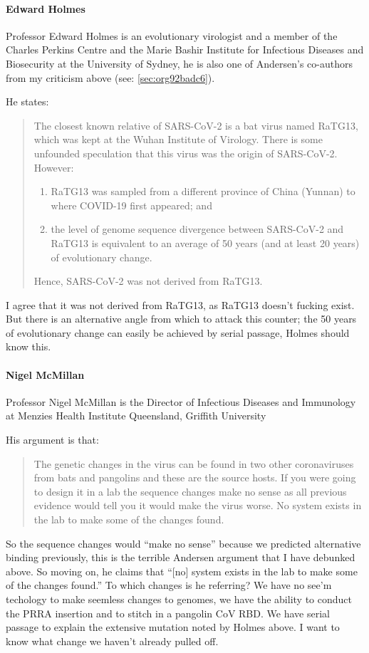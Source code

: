 \documentclass[11pt]{article}
\begin{document}
\paragraph{Edward Holmes}
\label{sec:orga7ef0a5}
Professor Edward Holmes is an evolutionary virologist and a member of the Charles Perkins Centre and the Marie Bashir Institute for Infectious Diseases and Biosecurity at the University of Sydney, he is also one of Andersen's co-authors from my criticism above (see: \ref{sec:org92badc6}).

He states:
\begin{quote}
The closest known relative of SARS-CoV-2 is a bat virus named RaTG13, which was kept at the Wuhan Institute of Virology. There is some unfounded speculation that this virus was the origin of SARS-CoV-2. However:

\begin{enumerate}
\item RaTG13 was sampled from a different province of China (Yunnan) to where COVID-19 first appeared; and
\item the level of genome sequence divergence between SARS-CoV-2 and RaTG13 is equivalent to an average of 50 years (and at least 20 years) of evolutionary change.
\end{enumerate}

Hence, SARS-CoV-2 was not derived from RaTG13.
\end{quote}
I agree that it was not derived from RaTG13, as RaTG13 doesn't fucking exist. But there is an alternative angle from which to attack this counter; the 50 years of evolutionary change can easily be achieved by serial passage, Holmes should know this.

\paragraph{Nigel McMillan}
\label{sec:orgf974914}
Professor Nigel McMillan is the Director of Infectious Diseases and Immunology at Menzies Health Institute Queensland, Griffith University

His argument is that:
\begin{quote}
The genetic changes in the virus can be found in two other coronaviruses from bats and pangolins and these are the source hosts. If you were going to design it in a lab the sequence changes make no sense as all previous evidence would tell you it would make the virus worse. No system exists in the lab to make some of the changes found.
\end{quote}
So the sequence changes would ``make no sense'' because we predicted alternative binding previously, this is the terrible Andersen argument that I have debunked above. So moving on, he claims that ``[no] system exists in the lab to make some of the changes found.'' To which changes is he referring? We have no see'm techology to make seemless changes to genomes, we have the ability to conduct the PRRA insertion and to stitch in a pangolin CoV RBD. We have serial passage to explain the extensive mutation noted by Holmes above. I want to know what change we haven't already pulled off.
\end{document}
